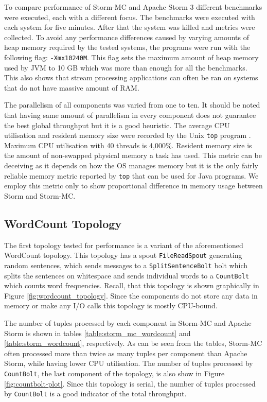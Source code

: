 \documentclass[bsc,deptreport,twoside,singlespacing,normalheadings,parskip]{infthesis}\usepackage[]{graphicx}\usepackage[]{color}
\begin{document}
To compare performance of Storm-MC and Apache Storm 3 different benchmarks were executed, each with a different focus. The benchmarks were executed with each system for five minutes. After that the system was killed and metrics were collected. To avoid any performance differences caused by varying amounts of heap memory required by the tested systems, the programs were run with the following flag: \texttt{-Xmx10240M}. This flag sets the maximum amount of heap memory used by JVM to 10 GB which was more than enough for all the benchmarks. This also shows that stream processing applications can often be ran on systems that do not have massive amount of RAM.

The parallelism of all components was varied from one to ten. It should be noted that having same amount of parallelism in every component does not guarantee the best global throughput but it is a good heuristic. The average CPU utilisation and resident memory size were recorded by the Unix \texttt{top} program \citep{UnixTop}. Maximum CPU utilisation with 40 threads is 4,000\%. Resident memory size is the amount of non-swapped physical memory a task has used. This metric can be deceiving as it depends on how the OS manages memory but it is the only fairly reliable memory metric reported by \texttt{top} that can be used for Java programs. We employ this metric only to show proportional difference in memory usage between Storm and Storm-MC.

\subsection{WordCount Topology}

The first topology tested for performance is a variant of the aforementioned WordCount topology. This topology has a spout \texttt{FileReadSpout} generating random sentences, which sends messages to a \texttt{SplitSentenceBolt} bolt which splits the sentences on whitespace and sends individual words to a \texttt{CountBolt} which counts word frequencies. Recall, that this topology is shown graphically in Figure \ref{fig:wordcount_topology}. Since the components do not store any data in memory or make any I/O calls this topology is mostly CPU-bound.

The number of tuples processed by each component in Storm-MC and Apache Storm is shown in tables \ref{table:storm_mc_wordcount} and \ref{table:storm_wordcount}, respectively. As can be seen from the tables, Storm-MC often processed more than twice as many tuples per component than Apache Storm, while having lower CPU utilisation. The number of tuples processed by \texttt{CountBolt}, the last component of the topology, is also show in Figure \ref{fig:countbolt-plot}. Since this topology is serial, the number of tuples processed by \texttt{CountBolt} is a good indicator of the total throughput.
\end{document}
